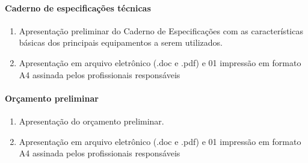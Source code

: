 \paragraph{Caderno de especificações técnicas}
\begin{enumerate}
	\item Apresentação preliminar do Caderno de Especificações com as características básicas dos principais equipamentos a serem utilizados.
	\item Apresentação em arquivo eletrônico (.doc e .pdf) e 01 impressão em formato A4 assinada pelos profissionais responsáveis
\end{enumerate}

\paragraph{Orçamento preliminar}
\begin{enumerate}
	\item Apresentação do orçamento preliminar.
	\item Apresentação em arquivo eletrônico (.doc e .pdf) e 01 impressão em formato A4 assinada pelos profissionais responsáveis
\end{enumerate}

